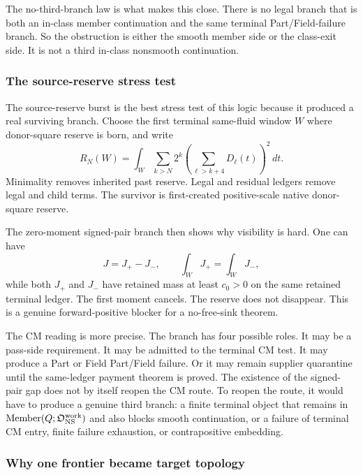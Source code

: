 The no-third-branch law is what makes this close.
There is no legal branch that is both an in-class member continuation and the
same terminal Part/Field-failure branch.
So the obstruction is either the smooth member side or the class-exit side.
It is not a third in-class nonsmooth continuation.

\subsubsection{The source-reserve stress test}

The source-reserve burst is the best stress test of this logic because it
produced a real surviving branch.
Choose the first terminal same-fluid window \(W\) where donor-square reserve is
born, and write
\[
  R_N(W)
  =
  \int_W
  \sum_{k>N}2^k
  \left(\sum_{\ell>k+4}D_\ell(t)\right)^2\,dt.
\]
Minimality removes inherited past reserve.
Legal and residual ledgers remove legal and child terms.
The survivor is first-created positive-scale native donor-square reserve.

The zero-moment signed-pair branch then shows why visibility is hard.
One can have
\[
  J=J_+-J_-,
  \qquad
  \int_W J_+ = \int_W J_-,
\]
while both \(J_+\) and \(J_-\) have retained mass at least \(c_0>0\) on the
same retained terminal ledger.
The first moment cancels.
The reserve does not disappear.
This is a genuine forward-positive blocker for a no-free-sink theorem.

The CM reading is more precise.
The branch has four possible roles.
It may be a pass-side requirement.
It may be admitted to the terminal CM test.
It may produce a Part or Field Part/Field failure.
Or it may remain supplier quarantine until the same-ledger payment theorem is
proved.
The existence of the signed-pair gap does not by itself reopen the CM route.
To reopen the route, it would have to produce a genuine third branch:
a finite terminal object that remains in \(\mathrm{Member}(Q;\mathfrak O_{\mathrm{NS}}^{\mathrm{work}})\) and also blocks
smooth continuation, or a failure of terminal CM entry, finite failure
exhaustion, or contrapositive embedding.

\subsubsection{Why one frontier became target topology}

